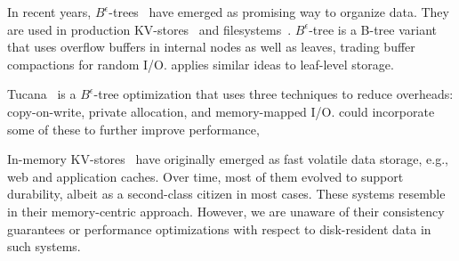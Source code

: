 In  recent years, $B^{\epsilon}$-trees~\cite{Brodal:2003:LBE:644108.644201} have emerged 
as promising way to organize data. They are used in production KV-stores~\cite{TokuDB} and filesystems~\cite{BetrFS}. 
$B^{\epsilon}$-tree is a B-tree variant that uses overflow buffers in internal nodes as well as leaves, trading buffer 
compactions for random I/O. \sys\/ applies similar ideas to leaf-level storage. 

Tucana~\cite{tucana} is a $B^{\epsilon}$-tree optimization that uses three techniques to reduce overheads: copy-on-write, 
private allocation, and memory-mapped I/O. \sys\/ could incorporate some of these to further improve performance, 

In-memory KV-stores~\cite{ignite, redis, memcached, Srinivasan:2016:AAR:3007263.3007276} have originally emerged as fast volatile 
data storage, e.g., web and application caches. Over time, most of them evolved to support durability,
albeit as a second-class citizen in most cases. 
These systems resemble \sys\/ in their memory-centric approach. 
However, we are unaware of their consistency guarantees or performance optimizations with respect  to disk-resident data in such systems. 

